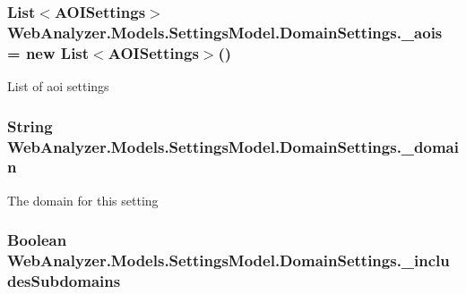 \subsubsection[{\+\_\+aois}]{\setlength{\rightskip}{0pt plus 5cm}List$<${\bf A\+O\+I\+Settings}$>$ Web\+Analyzer.\+Models.\+Settings\+Model.\+Domain\+Settings.\+\_\+aois = new List$<${\bf A\+O\+I\+Settings}$>$()\hspace{0.3cm}{\ttfamily [private]}}\label{class_web_analyzer_1_1_models_1_1_settings_model_1_1_domain_settings_a67344a2db4f2e9ee7951eb7cad18f96e}


List of aoi settings 

\hypertarget{class_web_analyzer_1_1_models_1_1_settings_model_1_1_domain_settings_afa680d53400203a363281f43b9ec7bff}{}
\subsubsection[{\+\_\+domain}]{\setlength{\rightskip}{0pt plus 5cm}String Web\+Analyzer.\+Models.\+Settings\+Model.\+Domain\+Settings.\+\_\+domain\hspace{0.3cm}{\ttfamily [private]}}\label{class_web_analyzer_1_1_models_1_1_settings_model_1_1_domain_settings_afa680d53400203a363281f43b9ec7bff}


The domain for this setting 

\hypertarget{class_web_analyzer_1_1_models_1_1_settings_model_1_1_domain_settings_ab1ad21ee7235f8b303bb0196bd3ede4f}{}
\subsubsection[{\+\_\+includes\+Subdomains}]{\setlength{\rightskip}{0pt plus 5cm}Boolean Web\+Analyzer.\+Models.\+Settings\+Model.\+Domain\+Settings.\+\_\+includes\+Subdomains\hspace{0.3cm}{\ttfamily [private]}}\label{class_web_analyzer_1_1_models_1_1_settings_model_1_1_domain_settings_ab1ad21ee7235f8b303bb0196bd3ede4f}


